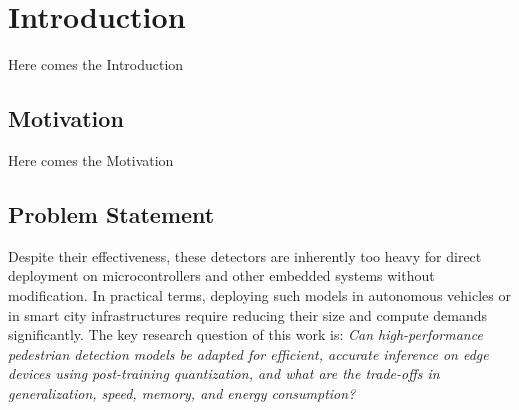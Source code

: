 \chapter{Introduction}
Here comes the Introduction

\section{Motivation}
Here comes the Motivation

\section{Problem Statement}
Despite their effectiveness, these detectors are inherently too heavy for direct deployment on microcontrollers and other embedded systems without modification. In practical terms, deploying such models in autonomous vehicles or in smart city infrastructures require reducing their size and compute demands significantly. The key research question of this work is: \textit{Can high-performance pedestrian detection models be adapted for efficient, accurate inference on edge devices using post-training quantization, and what are the trade-offs in generalization, speed, memory, and energy consumption?}
